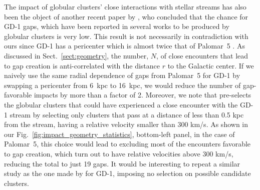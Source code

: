     The impact of globular clusters' close interactions with stellar streams has also been the object of another recent paper by \citet{2022ApJ...941..129D}, who concluded that the chance for GD-1 gaps, which have been reported in several works \citep[see, for example, ][]{2019ApJ...880...38B,2018MNRAS.477.1893D,2020AAS...23533607D} to be produced by globular clusters is very low. This result is not necessarily in contradiction with ours since GD-1 has a pericenter which is almost twice that of Palomar~5 \citep[see, for example][]{2019MNRAS.486.2995M}. As discussed in Sect.~\ref{sect:geometry}, the number, $N$, of close encounters that lead to gap creation is anti-correlated with the distance $r$ to the Galactic center. If we naively use the same radial dependence of gaps from Palomar~5 for GD-1 by swapping a pericenter from 6~kpc to 16~kpc, we would reduce the number of gap-favorable impacts by more than a factor of 2. Moreover, we note that \citet{2022ApJ...941..129D} pre-selects the globular clusters that could have experienced a close encounter with the GD-1 stream by selecting only clusters that pass at a distance of less than 0.5 kpc from the stream, having a relative velocity smaller than  300 km/s. As shown in our Fig.~\ref{fig:impact_geometry_statistics}, bottom-left panel, in the case of Palomar~5, this choice would lead to excluding most of the encounters favorable to gap creation, which turn out to have relative velocities above 300 km/s, reducing the total to just 19 gaps. It would be interesting to repeat a similar study as the one made by \citet{2022ApJ...941..129D} for GD-1, imposing no selection on possible candidate clusters.\\
  
